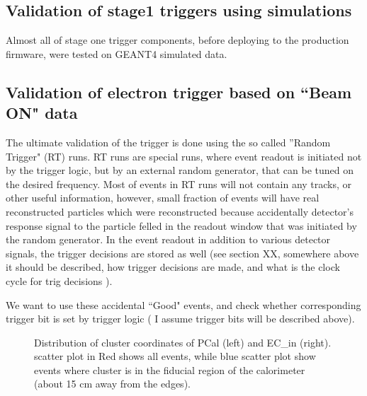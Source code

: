 
\subsection{Validation of stage1 triggers using simulations}
Almost all of stage one trigger components, before deploying to the production firmware, were tested on GEANT4 simulated data.

\subsection{Validation of electron trigger based on ``Beam ON" data}
\label{sec:validation_random}

The ultimate validation of the trigger is done using the so called ''Random Trigger" (RT) runs.
RT runs are special runs, where event readout is initiated not by the trigger logic, but by an external random generator, that
can be tuned on the desired frequency. Most of events in RT runs will not contain any tracks, or other useful information, however,
small fraction of events will have real reconstructed particles which were reconstructed because accidentally detector's response
signal to the particle felled in the readout window that was initiated by the random generator.
In the event readout in addition to various detector signals, the trigger decisions are stored as well (see section {\color{Red} XX, somewhere above
it should be described, how trigger decisions are made, and what is the clock cycle for trig decisions }).

We want to use these accidental ``Good" events, and check whether corresponding trigger bit is set by trigger logic ({\color{Red} I assume
trigger bits will be described above}).
\begin{figure}[!htb]
 \centering
 \caption{Distribution of cluster coordinates of PCal (left) and EC\_{in} (right).
 scatter plot in Red shows all events, while blue scatter plot show events where cluster
 is in the fiducial region of the calorimeter (about 15 cm away from the edges).}
\end{figure}

